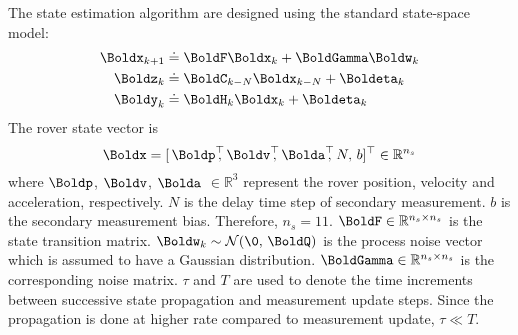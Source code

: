 The state estimation algorithm are designed using the standard state-space model:
\begin{align} \label{eqn:state_prop_model}
	\Boldx_{k+1} &\doteq \BoldF \Boldx_k + \BoldGamma \Boldw_k \\
	\label{eqn:delayed_msr_update_model}
	\Boldz_k &\doteq \BoldC_{k-N} \Boldx_{k-N} + \Boldeta_k	\\
	\label{eqn:msr_update_model}
	\Boldy_k &\doteq \BoldH_k \Boldx_k + \Boldeta_k	
\end{align} 
The rover state vector is 
\begin{equation} \label{eqn:state_vector}
	\Boldx = [\,\Boldp^\top \!\!\!, \, \Boldv^\top \!\!\!, \, \Bolda^\top \!\!\!, \, N, \, b]^\top 
	\in \mathbb{R}^{n_s}
\end{equation}
where $\Boldp$, $\Boldv$, $\Bolda$ $\in \mathbb{R}^3$ represent the rover position, velocity and acceleration, respectively. $N$ is the delay time step of secondary measurement. $b$ is the secondary measurement bias. 
Therefore, $n_s = 11$. $\BoldF \in \mathbb{R}^{n_s \times n_s}$ is the state transition matrix.
$\Boldw_k \sim \mathcal{N}(\0,\,\BoldQ)$ is the process noise vector which is assumed to have a Gaussian distribution. $\BoldGamma \in \mathbb{R}^{n_s \times n_s}$ is the corresponding noise matrix. $\tau$ and $T$ are used to denote the time increments between successive state propagation and measurement update steps. 
Since the propagation is done at higher rate compared to measurement update, $\tau \ll T$.

